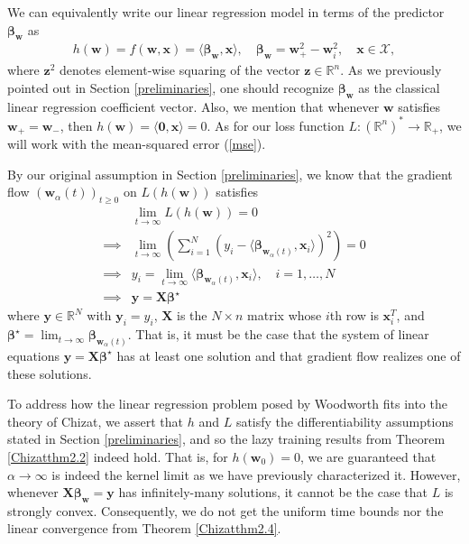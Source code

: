 \documentclass{article}
\begin{document}
We can equivalently write our linear regression model in terms of the predictor $\boldsymbol{\beta}_{\boldsymbol{w}}$ as
\begin{align}
    h(\boldsymbol{w}) = f(\boldsymbol{w}, \boldsymbol{x}) = \langle \boldsymbol{\beta}_{\boldsymbol{w}}, \boldsymbol{x} \rangle, \quad \boldsymbol{\beta}_{\boldsymbol{w}} = \boldsymbol{w}_{+}^2 - \boldsymbol{w}_{i}^2, \quad \boldsymbol{x} \in \mathcal{X},
\end{align}
where $\boldsymbol{z}^2$ denotes element-wise squaring of the vector $\boldsymbol{z} \in \mathbb{R}^n$. As we previously pointed out in Section \ref{preliminaries}, one should recognize $\boldsymbol{\beta}_{\boldsymbol{w}}$ as the classical linear regression coefficient vector. Also, we mention that whenever $\boldsymbol{w}$ satisfies $\boldsymbol{w}_+ = \boldsymbol{w}_-$, then $h(\boldsymbol{w}) = \langle \boldsymbol{0}, \boldsymbol{x} \rangle = 0$. As for our loss function $L: (\mathbb{R}^n)^* \rightarrow \mathbb{R}_+$, we will work with the mean-squared error (\ref{mse}).


By our original assumption in Section \ref{preliminaries}, we know that the gradient flow $(\boldsymbol{w}_{\alpha}(t))_{t \geq 0}$ on $L(h(\boldsymbol{w}))$ satisfies
\begin{align*}
    &\lim_{t \to \infty} L(h(\boldsymbol{w})) = 0\\
    \implies&\lim_{t \to \infty} \left( \sum_{i=1}^N (y_i - \langle \boldsymbol{\beta}_{\boldsymbol{w}_{\alpha}(t)}, \boldsymbol{x}_i \rangle)^2 \right) = 0\\
    \implies& y_i = \lim_{t \to \infty} \langle \boldsymbol{\beta}_{\boldsymbol{w}_{\alpha}(t)}, \boldsymbol{x}_i \rangle,\quad i = 1, \ldots, N\\
    \implies& \boldsymbol{y} = \boldsymbol{X}\boldsymbol{\beta}^{\star} 
\end{align*}
where $\boldsymbol{y} \in \mathbb{R}^N$ with $\boldsymbol{y}_i = y_i$, $\boldsymbol{X}$ is the $N \times n$ matrix whose $i$th row is $\boldsymbol{x}_i^T$, and $\boldsymbol{\beta}^{\star} = \lim_{t \to \infty} \boldsymbol{\beta}_{\boldsymbol{w}_{\alpha}(t)}$. That is, it must be the case that the system of linear equations $\boldsymbol{y} = \boldsymbol{X}\boldsymbol{\beta}^{\star}$ has at least one solution and that gradient flow realizes one of these solutions.

To address how the linear regression problem posed by Woodworth fits into the theory of Chizat, we assert that $h$ and $L$ satisfy the differentiability assumptions stated in Section \ref{preliminaries}, and so the lazy training results from Theorem \ref{Chizatthm2.2} indeed hold. That is, for $h(\boldsymbol{w}_0) = 0$, we are guaranteed that $\alpha \rightarrow \infty$ is indeed the kernel limit as we have previously characterized it. However, whenever $\boldsymbol{X} \boldsymbol{\beta}_{\boldsymbol{w}} = \boldsymbol{y}$ has infinitely-many solutions, it cannot be the case that $L$ is strongly convex. Consequently, we do not get the uniform time bounds nor the linear convergence from Theorem \ref{Chizatthm2.4}.
\end{document}
